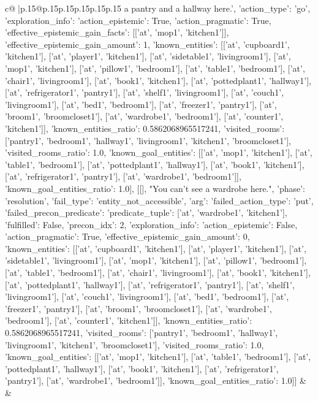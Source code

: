 \documentclass{article}
\begin{document}
{\begin{supertabular}{c@{$\;$}|p{.15\linewidth}@{}p{.15\linewidth}p{.15\linewidth}p{.15\linewidth}p{.15\linewidth}p{.15\linewidth}}
{{{a pantry and a hallway here.', {'action_type': 'go', 'exploration_info': {'action_epistemic': True, 'action_pragmatic': True, 'effective_epistemic_gain_facts': [['at', 'mop1', 'kitchen1']], 'effective_epistemic_gain_amount': 1, 'known_entities': [['at', 'cupboard1', 'kitchen1'], ['at', 'player1', 'kitchen1'], ['at', 'sidetable1', 'livingroom1'], ['at', 'mop1', 'kitchen1'], ['at', 'pillow1', 'bedroom1'], ['at', 'table1', 'bedroom1'], ['at', 'chair1', 'livingroom1'], ['at', 'book1', 'kitchen1'], ['at', 'pottedplant1', 'hallway1'], ['at', 'refrigerator1', 'pantry1'], ['at', 'shelf1', 'livingroom1'], ['at', 'couch1', 'livingroom1'], ['at', 'bed1', 'bedroom1'], ['at', 'freezer1', 'pantry1'], ['at', 'broom1', 'broomcloset1'], ['at', 'wardrobe1', 'bedroom1'], ['at', 'counter1', 'kitchen1']], 'known_entities_ratio': 0.5862068965517241, 'visited_rooms': ['pantry1', 'bedroom1', 'hallway1', 'livingroom1', 'kitchen1', 'broomcloset1'], 'visited_rooms_ratio': 1.0, 'known_goal_entities': [['at', 'mop1', 'kitchen1'], ['at', 'table1', 'bedroom1'], ['at', 'pottedplant1', 'hallway1'], ['at', 'book1', 'kitchen1'], ['at', 'refrigerator1', 'pantry1'], ['at', 'wardrobe1', 'bedroom1']], 'known_goal_entities_ratio': 1.0}}], [[], "You can't see a wardrobe here.", {'phase': 'resolution', 'fail_type': 'entity_not_accessible', 'arg': {'failed_action_type': 'put', 'failed_precon_predicate': {'predicate_tuple': ['at', 'wardrobe1', 'kitchen1'], 'fulfilled': False, 'precon_idx': 2}}, 'exploration_info': {'action_epistemic': False, 'action_pragmatic': True, 'effective_epistemic_gain_amount': 0, 'known_entities': [['at', 'cupboard1', 'kitchen1'], ['at', 'player1', 'kitchen1'], ['at', 'sidetable1', 'livingroom1'], ['at', 'mop1', 'kitchen1'], ['at', 'pillow1', 'bedroom1'], ['at', 'table1', 'bedroom1'], ['at', 'chair1', 'livingroom1'], ['at', 'book1', 'kitchen1'], ['at', 'pottedplant1', 'hallway1'], ['at', 'refrigerator1', 'pantry1'], ['at', 'shelf1', 'livingroom1'], ['at', 'couch1', 'livingroom1'], ['at', 'bed1', 'bedroom1'], ['at', 'freezer1', 'pantry1'], ['at', 'broom1', 'broomcloset1'], ['at', 'wardrobe1', 'bedroom1'], ['at', 'counter1', 'kitchen1']], 'known_entities_ratio': 0.5862068965517241, 'visited_rooms': ['pantry1', 'bedroom1', 'hallway1', 'livingroom1', 'kitchen1', 'broomcloset1'], 'visited_rooms_ratio': 1.0, 'known_goal_entities': [['at', 'mop1', 'kitchen1'], ['at', 'table1', 'bedroom1'], ['at', 'pottedplant1', 'hallway1'], ['at', 'book1', 'kitchen1'], ['at', 'refrigerator1', 'pantry1'], ['at', 'wardrobe1', 'bedroom1']], 'known_goal_entities_ratio': 1.0}}]] 
	  } 
	   } 
	   } 
	 & & \\ 
 


\end{supertabular}}
\end{document}

